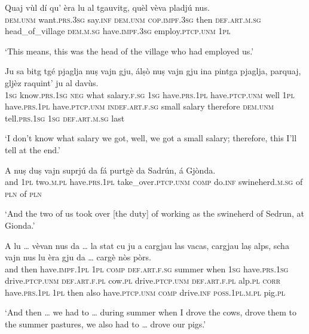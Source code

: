 \begin{linenumbers}
	\gll    Quaj vùl dí qu’ èra lu al tgauvitg, quèl vèva pladjú nus.\\
	\textsc{dem.unm} want.\textsc{prs.3sg} say.\textsc{inf} \textsc{dem.unm} \textsc{cop.impf.3sg} then \textsc{def.art.m.sg} head\_of\_village \textsc{dem.m.sg} have.\textsc{impf.3sg} employ.\textsc{ptcp.unm} \textsc{1pl}  \textsc{}  \textsc{}  \textsc{}  \textsc{}  \textsc{} \\
\end{linenumbers}
\medskip
\glt `This means, this was the head of the village who had employed us.'
\medskip

\begin{linenumbers}
	\gll    Ju sa bitg tgé pjaglja nuṣ vajn gju, álṣò nuṣ vajn gju ina pintga pjaglja, parquaj, gljèz raquint' ju al davùs.\\
	\textsc{1sg} know.\textsc{prs.1sg} \textsc{neg} what  salary.\textsc{f.sg}  \textsc{1sg}  have.\textsc{prs.1pl} have.\textsc{ptcp.unm} well \textsc{1pl} have.\textsc{prs.1pl}  have.\textsc{ptcp.unm} \textsc{indef.art.f.sg} small salary therefore \textsc{dem.unm} tell.\textsc{prs.1sg} \textsc{1sg} \textsc{def.art.m.sg} last \\
\end{linenumbers}
\medskip
\glt `I don’t know what salary we got, well, we got a small salary; therefore, this I’ll tell at the end.'
\medskip

\begin{linenumbers}
	\gll    A nuṣ duṣ vajn suprjú da fá purtgè da Sadrún, á Gjònda.\\
	and \textsc{1pl} two.\textsc{m.pl} have.\textsc{prs.1pl} take\_over.\textsc{ptcp.unm}  \textsc{comp} do.\textsc{inf}  swineherd.\textsc{m.sg} of  \textsc{pln} of \textsc{pln}\\
\end{linenumbers}
\medskip
\glt `And the two of us took over [the duty] of working as the swineherd of Sedrun, at Gionda.'
\medskip

\begin{linenumbers}
	\gll    A lu … vèvan nus da … la stat cu ju a cargjau las vacas, cargjau laṣ alps, scha vajn nus lu èra gju da … cargè nòs pòrs.\\
	and then {} have.\textsc{impf.1pl} \textsc{1pl}  \textsc{comp} {} \textsc{def.art.f.sg} summer when  \textsc{1sg} have.\textsc{prs.1sg} drive.\textsc{ptcp.unm} \textsc{def.art.f.pl} cow.\textsc{pl} drive.\textsc{ptcp.unm} \textsc{def.art.f.pl} alp.\textsc{pl} \textsc{corr} have.\textsc{prs.1pl} \textsc{1pl} then also have.\textsc{ptcp.unm} \textsc{comp} {} drive.\textsc{inf} {} \textsc{poss.1pl.m.pl} pig.\textsc{pl}\\
\end{linenumbers}
\medskip
\glt `And then … we had to … during summer when I drove the cows, drove them to the summer pastures, we also had to … drove our pigs.'
\medskip


